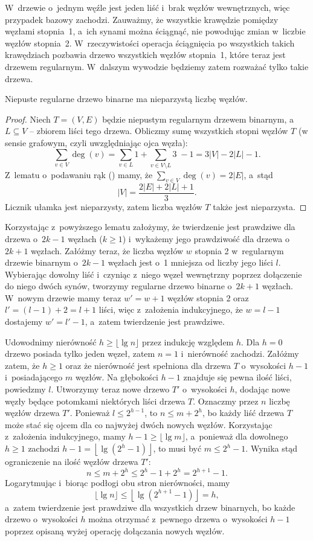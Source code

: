 \exercise %
W~drzewie o~jednym węźle jest jeden liść i~brak węzłów wewnętrznych, więc przypadek bazowy zachodzi. Zauważmy, że wszystkie krawędzie pomiędzy węzłami stopnia~1, a~ich synami można ściągnąć, nie powodując zmian w~liczbie węzłów stopnia~2. W~rzeczywistości operacja ściągnięcia po wszystkich takich krawędziach pozbawia drzewo wszystkich węzłów stopnia~1, które teraz jest drzewem regularnym. W~dalszym wywodzie będziemy zatem rozważać tylko takie drzewa.
\begin{lemat}
	Niepuste regularne drzewo binarne ma nieparzystą liczbę węzłów.
\end{lemat}
\begin{proof}
Niech $T=(V,E)$ będzie niepustym regularnym drzewem binarnym, a~$L\subseteq V$ -- zbiorem liści tego drzewa. Obliczmy sumę wszystkich stopni węzłów $T$ (w sensie grafowym, czyli uwzględniając ojca węzła):
\[
	\sum_{v\in V}\deg(v) = \sum_{v\in L}1+\sum_{v\in V\setminus L}\!\!\!3\;-1=3|V|-2|L|-1.
\]
Z~lematu o~podawaniu rąk () mamy, że $\sum_{v\in V}\deg(v) = 2|E|$, a~stąd
\[
	|V| = \frac{2|E|+2|L|+1}{3}.
\]
Licznik ułamka jest nieparzysty, zatem liczba węzłów $T$ także jest nieparzysta.
\end{proof}

Korzystając z~powyższego lematu założymy, że twierdzenie jest prawdziwe dla drzewa o~$2k-1$ węzłach ($k\ge1$) i~wykażemy jego prawdziwość dla drzewa o~$2k+1$ węzłach. Załóżmy teraz, że liczba węzłów $w$ stopnia 2 w~regularnym drzewie binarnym o~$2k-1$ węzłach jest o~1 mniejsza od liczby jego liści $l$. Wybierając dowolny liść i~czyniąc z~niego węzeł wewnętrzny poprzez dołączenie do niego dwóch synów, tworzymy regularne drzewo binarne o~$2k+1$ węzłach. W~nowym drzewie mamy teraz $w'=w+1$ węzłów stopnia 2 oraz $l'=(l-1)+2=l+1$ liści, więc z~założenia indukcyjnego, że $w=l-1$ dostajemy $w'=l'-1$, a~zatem twierdzenie jest prawdziwe.

\exercise %
Udowodnimy nierówność $h\ge\lfloor\lg n\rfloor$ przez indukcję względem $h$. Dla $h=0$ drzewo posiada tylko jeden węzeł, zatem $n=1$ i~nierówność zachodzi. Załóżmy zatem, że $h\ge1$ oraz że nierówność jest spełniona dla drzewa $T$ o~wysokości $h-1$ i~posiadającego $m$ węzłów. Na głębokości $h-1$ znajduje się pewna ilość liści, powiedzmy $l$. Utworzymy teraz nowe drzewo $T'$ o~wysokości $h$, dodając nowe węzły będące potomkami niektórych liści drzewa $T$. Oznaczmy przez $n$ liczbę węzłów drzewa $T'$. Ponieważ $l\le2^{h-1}$, to $n\le m+2^h$, bo każdy liść drzewa $T$ może stać się ojcem dla co najwyżej dwóch nowych węzłów. Korzystając z~założenia indukcyjnego, mamy $h-1\ge\lfloor\lg m\rfloor$, a~ponieważ dla dowolnego $h\ge1$ zachodzi $h-1=\left\lfloor\lg(2^h-1)\right\rfloor$, to musi być $m\le 2^h-1$. Wynika stąd ograniczenie na ilość węzłów drzewa $T'$:
\[
	n \le m+2^h \le 2^h-1+2^h = 2^{h+1}-1.
\]
Logarytmując i~biorąc podłogi obu stron nierówności, mamy
\[
	\lfloor\lg n\rfloor \le \left\lfloor\lg(2^{h+1}-1)\right\rfloor = h,
\]
a~zatem twierdzenie jest prawdziwe dla wszystkich drzew binarnych, bo każde drzewo o~wysokości $h$ można otrzymać z~pewnego drzewa o~wysokości $h-1$ poprzez opisaną wyżej operację dołączania nowych węzłów.

